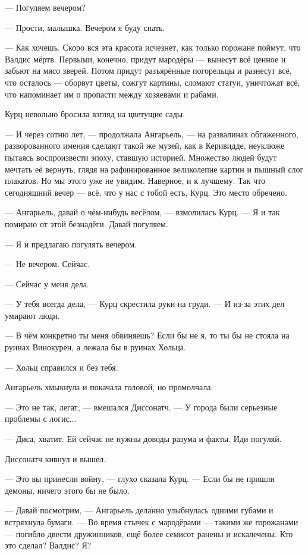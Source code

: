 --- Погуляем вечером?

--- Прости, малышка.
Вечером я буду спать.

--- Как хочешь.
Скоро вся эта красота исчезнет, как только горожане поймут, что Валдис мёртв.
Первыми, конечно, придут мародёры --- вынесут всё ценное и забьют на мясо зверей.
Потом придут разъярённые погорельцы и разнесут всё, что осталось --- оборвут цветы, сожгут картины, сломают статуи, уничтожат всё, что напоминает им о пропасти между хозяевами и рабами.

Курц невольно бросила взгляд на цветущие сады.

--- И через сотню лет, --- продолжала Ангарьель, --- на развалинах обгаженного, разворованного имения сделают такой же музей, как в Керивидде, неуклюже пытаясь воспроизвести эпоху, ставшую историей.
Множество людей будут мечтать её вернуть, глядя на рафинированное великолепие картин и пышный слог плакатов.
Но мы этого уже не увидим.
Наверное, и к лучшему.
Так что сегодняшний вечер --- всё, что у нас с тобой есть, Курц.
Это место обречено.

--- Ангарьель, давай о чём-нибудь весёлом, --- взмолилась Курц.
--- Я и так помираю от этой безнадёги.
Давай погуляем.

--- Я и предлагаю погулять вечером.

--- Не вечером.
Сейчас.

--- Сейчас у меня дела.

--- У тебя всегда дела, --- Курц скрестила руки на груди.
--- И из-за этих дел умирают люди.

--- В чём конкретно ты меня обвиняешь?
Если бы не я, то ты бы не стояла на руинах Винокурен, а лежала бы в руинах Хольца.

--- Хольц справился и без тебя.

Ангарьель хмыкнула и покачала головой, но промолчала.

--- Это не так, легат, --- вмешался Диссонатч.
--- У города были серьезные проблемы с логис...

--- Диса, хватит.
Ей сейчас не нужны доводы разума и факты.
Иди погуляй.

Диссонатч кивнул и вышел.

\asterism

--- Это вы принесли войну, --- глухо сказала Курц.
--- Если бы не пришли демоны, ничего этого бы не было.

--- Давай посмотрим, --- Ангарьель деланно улыбнулась одними губами и встряхнула бумаги.
--- Во время стычек с мародёрами --- такими же горожанами --- погибло двести дружинников, ещё более семисот ранены и искалечены.
Кто это сделал?
Валдис?
Я?

